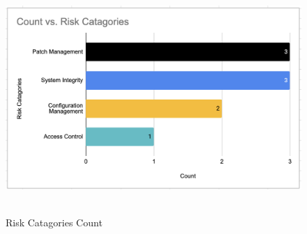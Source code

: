 \begin{figure}[htp!]
\centering
\includegraphics[width=\textwidth, height=330px]{pics/risk_cat.png}
\caption{Risk Catagories Count}\label{fig:bar_risks}
\end{figure}

